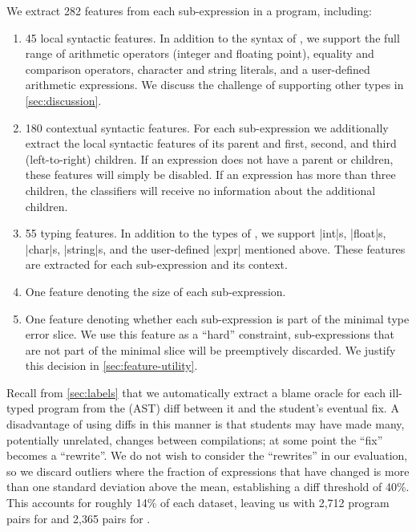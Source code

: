 We extract 282 features from each sub-expression in a
program, including:
%
\begin{enumerate}
\item 45 local syntactic features. In addition to the syntax of \lang,
  we support the full range of arithmetic operators (integer and
  floating point), equality and comparison operators, character and
  string literals, and a user-defined %
  arithmetic
  expressions. We discuss the challenge of supporting other
  types in \autoref{sec:discussion}.
\item 180 contextual syntactic features. For each sub-expression we
  additionally extract the local syntactic features of its parent and
  first, second, and third (left-to-right) children. If an expression
  does not have a parent or children, these features will simply be
  disabled. If an expression has more than three children, the
  classifiers will receive no information about the additional
  children.
\item 55 typing features. In addition to the types of \lang, we support
  |int|s, |float|s, |char|s, |string|s, and the user-defined |expr|
  mentioned above. These features are extracted for each sub-expression
  and its context. %
\item One feature denoting the size of each sub-expression.
\item One feature denoting whether each sub-expression is part of the
  minimal type error slice. We use this feature as a ``hard''
  constraint, sub-expressions that are not part of the minimal slice
  will be preemptively discarded. We justify this decision in
  \autoref{sec:feature-utility}.
\end{enumerate}

Recall from \autoref{sec:labels} that we automatically extract a blame
oracle for each ill-typed program from the (AST) diff between it and the
student's eventual fix.
%
A disadvantage of using diffs in this manner is that students may have
made many, potentially unrelated, changes between compilations; at some
point the ``fix'' becomes a ``rewrite''.
%
We do not wish to consider the ``rewrites'' in our evaluation, so we
discard outliers where the fraction of expressions that have changed is
more than one standard deviation above the mean, establishing a diff
threshold of 40\%.
%
This accounts for roughly 14\% of each dataset, leaving us with
2,712 program pairs for \SPRING and 2,365 pairs for \FALL.

